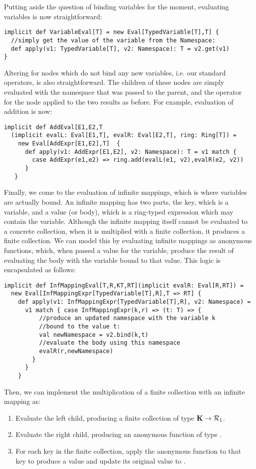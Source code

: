 Putting aside the question of binding variables for the moment, evaluating variables is now straightforward:
\vs\begin{lstlisting}
implicit def VariableEval[T] = new Eval[TypedVariable[T],T] {
  //simply get the value of the variable from the Namespace:
  def apply(v1: TypedVariable[T], v2: Namespace): T = v2.get(v1) 
}
\end{lstlisting}\vs
Altering  for nodes which do not bind any new variables, i.e. our standard operators, is also straightforward. The children of these nodes are simply evaluated with the namespace that was passed to the parent, and the operator for the node applied to the two results as before. For example, evaluation of addition is now:
\vs\begin{lstlisting}
implicit def AddEval[E1,E2,T
  (implicit evalL: Eval[E1,T], evalR: Eval[E2,T], ring: Ring[T]) =
    new Eval[AddExpr[E1,E2],T]  {
      def apply(v1: AddExpr[E1,E2], v2: Namespace): T = v1 match {
        case AddExpr(e1,e2) => ring.add(evalL(e1, v2),evalR(e2, v2))
      }
   }
\end{lstlisting}\vs
Finally, we come to the evaluation of infinite mappings, which is where variables are actually bound. An infinite mapping has two parts, the key, which is a variable, and a value (or body), which is a ring-typed expression which may contain the variable. Although the infinite mapping itself cannot be evaluated to a concrete collection, when it is multiplied with a finite collection, it produces a finite collection. We can model this by evaluating infinite mappings as anonymous functions, which, when passed a value for the variable, produce the result of evaluating the body with the variable bound to that value. This logic is encapsulated as follows:
\vs\begin{lstlisting}
implicit def InfMappingEval[T,R,KT,RT](implicit evalR: Eval[R,RT]) =
  new Eval[InfMappingExpr[TypedVariable[T],R],T => RT] {
    def apply(v1: InfMappingExpr[TypedVariable[T],R], v2: Namespace) =
      v1 match { case InfMappingExpr(k,r) => (t: T) => {
          //produce an updated namespace with the variable k
          //bound to the value t:
          val newNamespace = v2.bind(k,t)
          //evaluate the body using this namespace
          evalR(r,newNamespace) 
        }
      }
    }
\end{lstlisting}\vs
Then, we can implement the multiplication of a finite collection with an infinite mapping as:
\begin{enumerate}
\item{Evaluate the left child, producing a finite collection of type $\mathbf{K} \rightarrow \mathcal{R}_1$}.
\item{Evaluate the right child, producing an anonymous function of type }.
\item{For each key in the finite collection, apply the anonymous function to that key to produce a value  and update its original value  to .}
\end{enumerate}
